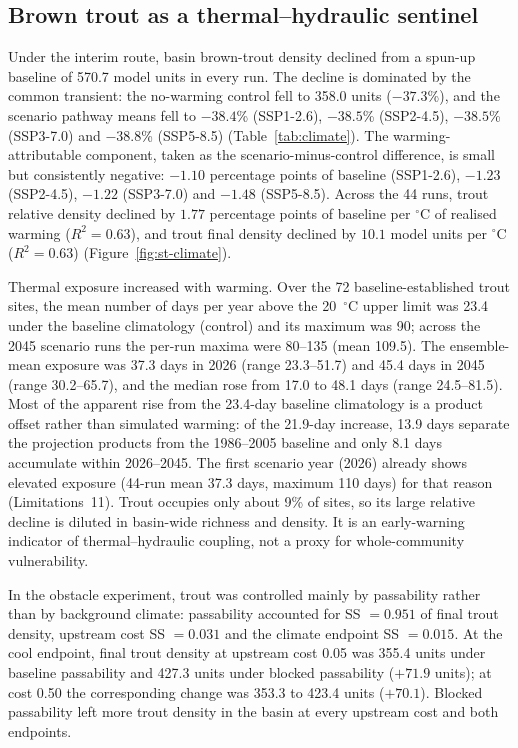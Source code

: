 \documentclass[11pt,a4paper]{article}
\begin{document}
\subsection{Brown trout as a thermal--hydraulic sentinel}

Under the interim route, basin brown-trout density declined from a spun-up baseline of 570.7 model units in every run. The decline is dominated by the common transient: the no-warming control fell to 358.0 units ($-37.3$\%), and the scenario pathway means fell to $-38.4$\% (SSP1-2.6), $-38.5$\% (SSP2-4.5), $-38.5$\% (SSP3-7.0) and $-38.8$\% (SSP5-8.5) (Table~\ref{tab:climate}). The warming-attributable component, taken as the scenario-minus-control difference, is small but consistently negative: $-1.10$ percentage points of baseline (SSP1-2.6), $-1.23$ (SSP2-4.5), $-1.22$ (SSP3-7.0) and $-1.48$ (SSP5-8.5). Across the 44 runs, trout relative density declined by $1.77$ percentage points of baseline per $^\circ$C of realised warming ($R^2=0.63$), and trout final density declined by $10.1$ model units per $^\circ$C ($R^2=0.63$) (Figure~\ref{fig:st-climate}).

Thermal exposure increased with warming. Over the 72 baseline-established trout sites, the mean number of days per year above the 20~$^\circ$C upper limit was 23.4 under the baseline climatology (control) and its maximum was 90; across the 2045 scenario runs the per-run maxima were 80--135 (mean 109.5). The ensemble-mean exposure was 37.3 days in 2026 (range 23.3--51.7) and 45.4 days in 2045 (range 30.2--65.7), and the median rose from 17.0 to 48.1 days (range 24.5--81.5). Most of the apparent rise from the 23.4-day baseline climatology is a product offset rather than simulated warming: of the 21.9-day increase, 13.9 days separate the projection products from the 1986--2005 baseline and only 8.1 days accumulate within 2026--2045. The first scenario year (2026) already shows elevated exposure (44-run mean 37.3 days, maximum 110 days) for that reason (Limitations~11). Trout occupies only about 9\% of sites, so its large relative decline is diluted in basin-wide richness and density. It is an early-warning indicator of thermal--hydraulic coupling, not a proxy for whole-community vulnerability.

In the obstacle experiment, trout was controlled mainly by passability rather than by background climate: passability accounted for SS $=0.951$ of final trout density, upstream cost SS $=0.031$ and the climate endpoint SS $=0.015$. At the cool endpoint, final trout density at upstream cost 0.05 was 355.4 units under baseline passability and 427.3 units under blocked passability ($+71.9$ units); at cost 0.50 the corresponding change was 353.3 to 423.4 units ($+70.1$). Blocked passability left more trout density in the basin at every upstream cost and both endpoints.
\end{document}
